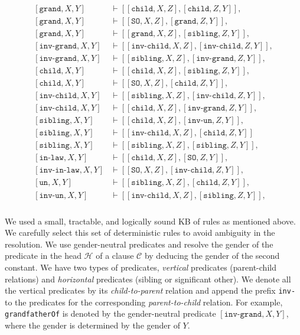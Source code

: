 \documentclass[letterpaper, 12pt]{report}
\begin{document}
\footnotesize
\begin{align*}
\begin{split}
    [\texttt{grand}, X,Y] &\vdash [[\texttt{child}, X,Z],[\texttt{child}, Z,Y]], \\
    [\texttt{grand}, X,Y] &\vdash [[\texttt{SO}, X,Z],[\texttt{grand}, Z,Y]], \\
    [\texttt{grand}, X,Y] &\vdash [[\texttt{grand}, X,Z], [\texttt{sibling}, Z,Y]], \\
    [\texttt{inv-grand}, X,Y] &\vdash [[\texttt{inv-child}, X,Z], [\texttt{inv-child}, Z,Y]], \\
    [\texttt{inv-grand}, X,Y] &\vdash [[\texttt{sibling}, X,Z], [\texttt{inv-grand}, Z,Y]], \\
    [\texttt{child}, X,Y] &\vdash [[\texttt{child}, X,Z], [\texttt{sibling}, Z,Y]], \\
  [\texttt{child}, X,Y] &\vdash [[\texttt{SO}, X,Z], [\texttt{child}, Z,Y]], \\
  [\texttt{inv-child}, X,Y] &\vdash [[\texttt{sibling}, X,Z], [\texttt{inv-child}, Z,Y]], \\
    [\texttt{inv-child}, X,Y] &\vdash [[\texttt{child}, X,Z], [\texttt{inv-grand}, Z,Y]], \\
    [\texttt{sibling}, X,Y] &\vdash [[\texttt{child}, X,Z], [\texttt{inv-un}, Z,Y]], \\
    [\texttt{sibling}, X,Y] &\vdash [[\texttt{inv-child}, X,Z], [\texttt{child}, Z,Y]] \\
    [\texttt{sibling}, X,Y] &\vdash [[\texttt{sibling}, X,Z],[\texttt{sibling}, Z,Y]], \\
    [\texttt{in-law}, X,Y] &\vdash [[\texttt{child}, X,Z],[\texttt{SO}, Z,Y]], \\
    [\texttt{inv-in-law}, X,Y] &\vdash [[\texttt{SO}, X,Z],[\texttt{inv-child}, Z,Y]], \\
    [\texttt{un}, X,Y] &\vdash [[\texttt{sibling}, X,Z],[\texttt{child}, Z,Y]], \\
    [\texttt{inv-un}, X,Y] &\vdash [[\texttt{inv-child}, X,Z],[\texttt{sibling}, Z,Y]], \\
\end{split}
\end{align*}
\normalsize


We used a small, tractable, and logically sound KB of rules as mentioned above. We carefully select this set of deterministic rules to avoid ambiguity in the resolution. We use gender-neutral predicates and resolve the gender of the predicate in the head $\mathcal{H}$ of a clause $\mathcal{C}$ by deducing the gender of the second constant. We have two types of predicates, \textit{vertical} predicates (parent-child relations) and  \textit{horizontal} predicates (sibling or significant other). We denote all the vertical predicates by its \textit{child-to-parent} relation and append the prefix \texttt{inv-} to the predicates for the corresponding \textit{parent-to-child} relation. For example, \texttt{grandfatherOf} is denoted by the gender-neutral predicate $[\texttt{inv-grand},X,Y]$, where the gender is determined by the gender of $Y$.
\end{document}

